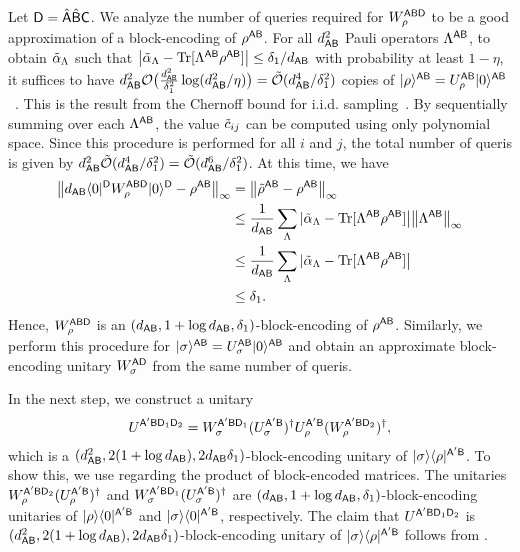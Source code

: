 Let ${\mathsf{D}} = \hat{{\mathsf{A}}}\hat{{\mathsf{B}}}{\mathsf{C}}$.
We analyze the number of queries required for $W_\rho^{{\mathsf{A}}{\mathsf{B}}{\mathsf{D}}}$ to be a good approximation of a block-encoding of $\rho^{{\mathsf{A}}{\mathsf{B}}}$.
For all $d_{{\mathsf{A}}{\mathsf{B}}}^2$ Pauli operators $\Lambda^{{\mathsf{A}}{\mathsf{B}}}$, to obtain $\tilde{\alpha}_\Lambda$ such that $\big|\tilde{\alpha}_\Lambda - \operatorname{Tr}[\Lambda^{{\mathsf{A}}{\mathsf{B}}}\rho^{{\mathsf{A}}{\mathsf{B}}}]\big| \leq \delta_1/d_{{\mathsf{A}}{\mathsf{B}}}$ with probability at least $1 - \eta$, it suffices to have $d_{{\mathsf{A}}{\mathsf{B}}}^2{\mathcal{O}}\big(\frac{d_{{\mathsf{A}}{\mathsf{B}}}^2}{\delta_1^2} \log(d_{{\mathsf{A}}{\mathsf{B}}}^2/\eta)\big) = \tilde{{\mathcal{O}}}(d_{{\mathsf{A}}{\mathsf{B}}}^4/\delta_1^2)$ copies of $|\rho\rangle^{{\mathsf{A}}{\mathsf{B}}} = U_\rho^{{\mathsf{A}}{\mathsf{B}}}|0\rangle^{{\mathsf{A}}{\mathsf{B}}}$~\cite{aaronson2007learnability, yuen2022lecturetomography}. This is the result from the Chernoff bound for i.i.d. sampling~\cite{chernoff1952measure, hoeffding1963Probability, motwani1995randomized, mitzenmacher2005probability}.
By sequentially summing over each $\Lambda^{{\mathsf{A}}{\mathsf{B}}}$, the value $\tilde{c}_{ij}$ can be computed using only polynomial space.
Since this procedure is performed for all $i$ and $j$, the total number of queris is given by $d_{{\mathsf{A}}{\mathsf{B}}}^2 \tilde{{\mathcal{O}}}(d_{{\mathsf{A}}{\mathsf{B}}}^4/\delta_1^2) = \tilde{{\mathcal{O}}}(d_{{\mathsf{A}}{\mathsf{B}}}^6/\delta_1^2)$.
At this time, we have
\begin{align}
    \big\|d_{{\mathsf{A}}{\mathsf{B}}}\langle0|^{{\mathsf{D}}}W_\rho^{{\mathsf{A}}{\mathsf{B}}{\mathsf{D}}}|0\rangle^{{\mathsf{D}}} - \rho^{{\mathsf{A}}{\mathsf{B}}}\big\|_\infty 
    &=\big\|\tilde{\rho}^{{\mathsf{A}}{\mathsf{B}}} - \rho^{{\mathsf{A}}{\mathsf{B}}}\big\|_\infty \\
    &\leq \frac{1}{d_{{\mathsf{A}}{\mathsf{B}}}}\sum_\Lambda |\tilde{\alpha}_\Lambda - \operatorname{Tr}[\Lambda^{{\mathsf{A}}{\mathsf{B}}}\rho^{{\mathsf{A}}{\mathsf{B}}}]\big| \big\|\Lambda^{{\mathsf{A}}{\mathsf{B}}}\big\|_\infty \\
    &\leq \frac{1}{d_{{\mathsf{A}}{\mathsf{B}}}}\sum_\Lambda |\tilde{\alpha}_\Lambda - \operatorname{Tr}[\Lambda^{{\mathsf{A}}{\mathsf{B}}}\rho^{{\mathsf{A}}{\mathsf{B}}}]\big| \\
    &\leq \delta_1.
\end{align}
Hence, $W_\rho^{{\mathsf{A}}{\mathsf{B}}{\mathsf{D}}}$ is an $(d_{{\mathsf{A}}{\mathsf{B}}}, 1 + \log{d_{{\mathsf{A}}{\mathsf{B}}}}, \delta_1)$-block-encoding of $\rho^{{\mathsf{A}}{\mathsf{B}}}$.
Similarly, we perform this procedure for $|\sigma\rangle^{{\mathsf{A}}{\mathsf{B}}} = U_\sigma^{{\mathsf{A}}{\mathsf{B}}}|0\rangle^{{\mathsf{A}}{\mathsf{B}}}$ and obtain an approximate block-encoding unitary $W_\sigma^{{\mathsf{A}}{\mathsf{D}}}$ from the same number of queris.


In the next step, we construct a unitary 
\begin{align}
    U^{{\mathsf{A}}'{\mathsf{B}}{\mathsf{D}}_1{\mathsf{D}}_2} = W_\sigma^{{\mathsf{A}}'{\mathsf{B}}{\mathsf{D}}_1}(U_\sigma^{{\mathsf{A}}'{\mathsf{B}}})^\dag U_\rho^{{\mathsf{A}}'{\mathsf{B}}}(W_\rho^{{\mathsf{A}}'{\mathsf{B}}{\mathsf{D}}_2})^\dag,
\end{align}
which is a $(d_{{\mathsf{A}}{\mathsf{B}}}^2, 2(1+\log{d_{{\mathsf{A}}{\mathsf{B}}}}), 2d_{{\mathsf{A}}{\mathsf{B}}}\delta_1)$-block-encoding unitary of $|\sigma\rangle\langle\rho|^{{\mathsf{A}}'{\mathsf{B}}}$.
To show this, we use  regarding the product of block-encoded matrices.
The unitaries $W_\rho^{{\mathsf{A}}'{\mathsf{B}}{\mathsf{D}}_2}(U_\rho^{{\mathsf{A}}'{\mathsf{B}}})^\dag$ and $W_\sigma^{{\mathsf{A}}'{\mathsf{B}}{\mathsf{D}}_1}(U_\sigma^{{\mathsf{A}}'{\mathsf{B}}})^\dag$ are $(d_{{\mathsf{A}}{\mathsf{B}}}, 1 + \log{d_{{\mathsf{A}}{\mathsf{B}}}}, \delta_1)$-block-encoding unitaries of $|\rho\rangle\langle0|^{{\mathsf{A}}'{\mathsf{B}}}$ and $|\sigma\rangle\langle0|^{{\mathsf{A}}'{\mathsf{B}}}$, respectively.
The claim that $U^{{\mathsf{A}}'{\mathsf{B}}{\mathsf{D}}_1{\mathsf{D}}_2}$ is $(d_{{\mathsf{A}}{\mathsf{B}}}^2, 2(1+\log{d_{{\mathsf{A}}{\mathsf{B}}}}), 2d_{{\mathsf{A}}{\mathsf{B}}}\delta_1)$-block-encoding unitary of $|\sigma\rangle\langle\rho|^{{\mathsf{A}}'{\mathsf{B}}}$ follows from .

